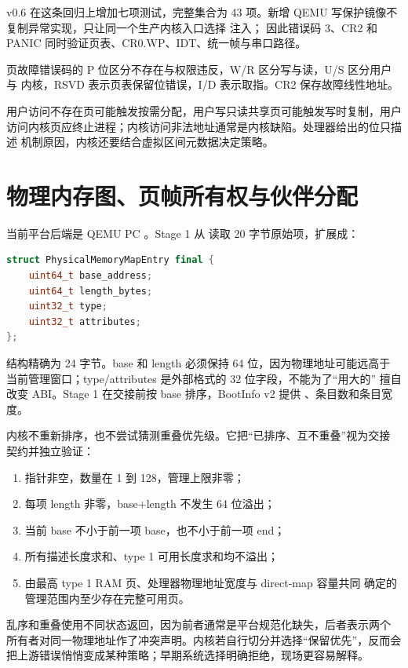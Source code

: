 v0.6 在这条回归上增加七项测试，完整集合为 43 项。新增 QEMU 写保护镜像不
复制异常实现，只让同一个生产内核入口选择  注入；
因此错误码 3、CR2 和 PANIC 同时验证页表、CR0.WP、IDT、统一帧与串口路径。

页故障错误码的 P 位区分不存在与权限违反，W/R 区分写与读，U/S 区分用户与
内核，RSVD 表示页表保留位错误，I/D 表示取指。CR2 保存故障线性地址。

用户访问不存在页可能触发按需分配，用户写只读共享页可能触发写时复制，用户
访问内核页应终止进程；内核访问非法地址通常是内核缺陷。处理器给出的位只描述
机制原因，内核还要结合虚拟区间元数据决定策略。

\section{物理内存图、页帧所有权与伙伴分配}

当前平台后端是 QEMU PC 。Stage 1 从
 读取 20 字节原始项，扩展成：

\begin{lstlisting}[language=C++]
struct PhysicalMemoryMapEntry final {
    uint64_t base_address;
    uint64_t length_bytes;
    uint32_t type;
    uint32_t attributes;
};
\end{lstlisting}

结构精确为 24 字节。base 和 length 必须保持 64 位，因为物理地址可能远高于
当前管理窗口；type/attributes 是外部格式的 32 位字段，不能为了“用大的”
擅自改变 ABI。Stage 1 在交接前按 base 排序，BootInfo v2 提供
、条目数和条目宽度。

内核不重新排序，也不尝试猜测重叠优先级。它把“已排序、互不重叠”视为交接
契约并独立验证：

\begin{enumerate}[label=\arabic*.]
  \item 指针非空，数量在 1 到 128，管理上限非零；
  \item 每项 length 非零，base+length 不发生 64 位溢出；
  \item 当前 base 不小于前一项 base，也不小于前一项 end；
  \item 所有描述长度求和、type 1 可用长度求和均不溢出；
  \item 由最高 type 1 RAM 页、处理器物理地址宽度与 direct-map 容量共同
        确定的管理范围内至少存在完整可用页。
\end{enumerate}

乱序和重叠使用不同状态返回，因为前者通常是平台规范化缺失，后者表示两个
所有者对同一物理地址作了冲突声明。内核若自行切分并选择“保留优先”，反而会
把上游错误悄悄变成某种策略；早期系统选择明确拒绝，现场更容易解释。

